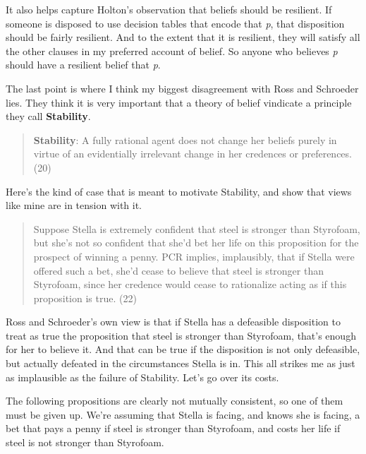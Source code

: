 It also helps capture Holton's observation that beliefs should be resilient. If someone is disposed to use decision tables that encode that \emph{p}, that disposition should be fairly resilient. And to the extent that it is resilient, they will satisfy all the other clauses in my preferred account of belief. So anyone who believes \emph{p} should have a resilient belief that \emph{p}.

The last point is where I think my biggest disagreement with Ross and Sch\-roeder lies. They think it is very important that a theory of belief vindicate a principle they call \textbf{Stability}.

\begin{quote}

\textbf{Stability}: A fully rational agent does not change her beliefs purely in virtue of an evidentially irrelevant change in her credences or preferences. (20)
\end{quote}
Here's the kind of case that is meant to motivate Stability, and show that views like mine are in tension with it.

\begin{quote}
Suppose Stella is extremely confident that steel is stronger than Styrofoam, but she's not so confident that she'd bet her life on this proposition for the prospect of winning a penny. PCR implies, implausibly, that if Stella were offered such a bet, she'd cease to believe that steel is stronger than Styrofoam, since her credence would cease to rationalize acting as if this proposition is true. (22)
\end{quote}
Ross and Schroeder's own view is that if Stella has a defeasible disposition to treat as true the proposition that steel is stronger than Styrofoam, that's enough for her to believe it. And that can be true if the disposition is not only defeasible, but actually defeated in the circumstances Stella is in. This all strikes me as just as implausible as the failure of Stability. Let's go over its costs.

The following propositions are clearly not mutually consistent, so one of them must be given up. We're assuming that Stella is facing, and knows she is facing, a bet that pays a penny if steel is stronger than Styrofoam, and costs her life if steel is not stronger than Styrofoam.

